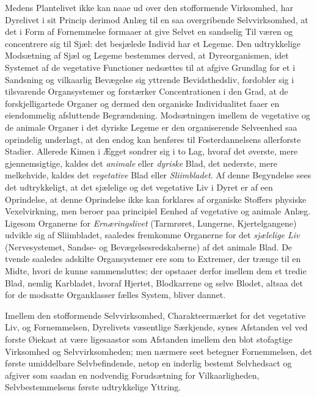 \documentclass[11pt]{book}
\newcommand{\opage}[1]{\marginnote{\footnotesize\textit{[#1]}}}
\begin{document}
Medens Plantelivet ikke kan naae ud over den stofformende
Virksomhed, har Dyrelivet i sit Princip derimod Anlæg til en saa
overgribende Selvvirksomhed, at det i Form af Fornemmelse formaaer at
give Selvet en sandselig Til\-%
\opage{269} \setcounter{footnote}{0}%
væren og concentrere sig til Sjæl: det
besjælede Individ har et Legeme. Den udtrykkelige Modsætning af Sjæl
og Legeme bestemmes derved, at Dyreorganismen, idet Systemet af de
vegetative Functioner nedsættes til at afgive Grundlag for et i
Sandsning og vilkaarlig Bevægelse sig yttrende Bevidsthedsliv,
fordobler sig i tilsvarende Organsystemer og forstærker
Concentrationen i den Grad, at de forskjelligartede Organer og dermed
den organiske Individualitet faaer en eiendommelig afsluttende
Begrændsning. Modsætningen imellem de vegetative og de animale
Organer i det dyriske Legeme er den organiserende Selveenhed saa
oprindelig underlagt, at den endog kan henføres til Fosterdannelsens
allerforste Stadier. Allerede Kimen i Ægget sondrer sig i to Lag,
hvoraf det øverste, mere gjennemsigtige, kaldes det \emph{animale}
eller \emph{dyriske} Blad, det nederste, mere melkehvide, kaldes det
\emph{vegetative} Blad eller \emph{Sliimbladet}. Af denne Begyndelse
sees det udtrykkeligt, at det sjælelige og det vegetative Liv i Dyret
er af een Oprindelse, at denne Oprindelse ikke kan forklares af
organiske Stoffers physiske Vexelvirkning, men beroer paa principiel
Eenhed af vegetative og animale Anlæg. Ligesom Organerne for
\emph{Ernæringslivet} (Tarmrøret, Lungerne, Kjertelgangene) udvikle
sig af Sliimbladet, saaledes fremkomme Organerne for det
\emph{sjælelige Liv} (Nervesystemet, Sandse- og
Bevægelsesredskaberne) af det animale Blad. De tvende saaledes
adskilte Organsystemer ere som to Extremer, der trænge til en Midte,
hvori de kunne sammensluttes; der opstaaer derfor imellem dem et
tredie Blad, nemlig Karbladet, hvoraf Hjertet, Blodkarrene og selve
Blodet, altsaa det for de modsatte Organklasser fælles System, bliver
dannet.

Imellem den stofformende Selvvirksomhed, Charakteermærket for det
vegetative Liv, og Fornemmelsen, Dyrelivets væsentlige Særkjende,
synes Afstanden vel ved forste Øiekast at være ligesaastor som
Afstanden imellem den blot stofagtige
\opage{270} \setcounter{footnote}{0}%
Virksomhed og Selvvirksomheden; men
nærmere seet betegner Fornemmelsen, det første umiddelbare
Selvbefindende, netop en inderlig bestemt Selvhedsact og afgiver som
saadan en nodvendig Forudsætning for Vilkaarligheden,
Selvbestemmelsens første udtrykkelige Yttring.
\end{document}
